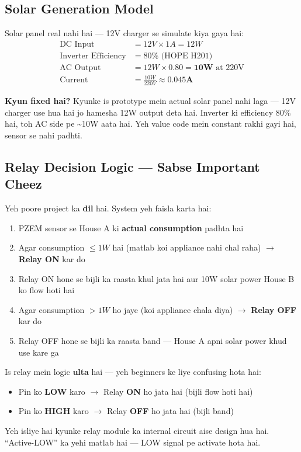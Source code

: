 \subsection{Solar Generation Model}

\begin{conceptbox}
Solar panel real nahi hai --- 12V charger se simulate kiya gaya hai:
\begin{align*}
\text{DC Input} &= 12V \times 1A = 12W \\
\text{Inverter Efficiency} &= 80\% \text{ (HOPE H201)} \\
\text{AC Output} &= 12W \times 0.80 = \mathbf{10W} \text{ at 220V} \\
\text{Current} &= \frac{10W}{220V} \approx \mathbf{0.045A}
\end{align*}
\end{conceptbox}

\textbf{Kyun fixed hai?} Kyunke is prototype mein actual solar panel nahi laga --- 12V charger use hua hai jo hamesha 12W output deta hai. Inverter ki efficiency 80\% hai, toh AC side pe \textasciitilde10W aata hai. Yeh value code mein constant rakhi gayi hai, sensor se nahi padhti.

\subsection{Relay Decision Logic --- Sabse Important Cheez}

Yeh poore project ka \textbf{dil} hai. System yeh faisla karta hai:

\begin{enumerate}
    \item PZEM sensor se House A ki \textbf{actual consumption} padhta hai
    \item Agar consumption $\leq 1W$ hai (matlab koi appliance nahi chal raha) $\rightarrow$ \textbf{Relay ON} kar do
    \item Relay ON hone se bijli ka raasta khul jata hai aur 10W solar power House B ko flow hoti hai
    \item Agar consumption $> 1W$ ho jaye (koi appliance chala diya) $\rightarrow$ \textbf{Relay OFF} kar do
    \item Relay OFF hone se bijli ka raasta band --- House A apni solar power khud use kare ga
\end{enumerate}

\begin{warnbox}
Is relay mein logic \textbf{ulta} hai --- yeh beginners ke liye confusing hota hai:
\begin{itemize}[nosep]
    \item Pin ko \textbf{LOW} karo $\rightarrow$ Relay \textbf{ON} ho jata hai (bijli flow hoti hai)
    \item Pin ko \textbf{HIGH} karo $\rightarrow$ Relay \textbf{OFF} ho jata hai (bijli band)
\end{itemize}
Yeh isliye hai kyunke relay module ka internal circuit aise design hua hai. ``Active-LOW'' ka yehi matlab hai --- LOW signal pe activate hota hai.
\end{warnbox}

